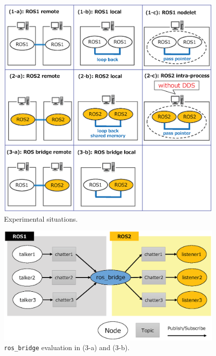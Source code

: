 \documentclass{sig-alternate-05-2015}
\begin{document}
\begin{figure}[t]
  \centering
  \includegraphics[width=0.8\linewidth]{../figure/eval_situation.eps}
  \vspace{-4mm}
  \caption{\label{fig:orgparagraph5}
    Experimental situations.}
  \vspace{-3mm}
\end{figure}

\begin{figure}[t]
  \centering
  \includegraphics[width=0.9\linewidth]{../figure/ros_bridge.eps}
  \vspace{-8mm}
  \caption{\label{fig:orgparagraph6}
    \texttt{ros\_bridge} evaluation in (3-a) and (3-b).}
  \vspace{-6mm}
\end{figure}

\end{document}
